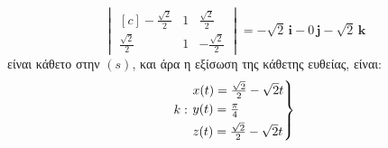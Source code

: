 \documentclass[a4paper,table]{report}
\begin{document}
\begin{solution}
\begin{enumerate}[i)]
\[\begin{vmatrix*}[c]
            - \frac{\sqrt{2}}{2} & 1 & \frac{\sqrt{2}}{2} \\[8pt]
            \frac{\sqrt{2}}{2} & 1 & - \frac{\sqrt{2}}{2} 
          \end{vmatrix*} = - \sqrt{2} \, \mathbf{i} - 0 \, \mathbf{j} - \sqrt{2} \,
          \mathbf{k}
         \] 
         είναι κάθετο στην $ (s) $, και άρα η εξίσωση της κάθετης ευθείας, είναι:
         \[
           k: \begin{rcases} 
             x(t) = \frac{\sqrt{2}}{2} - \sqrt{2} t \\
             y(t) = \frac{\pi}{4} \\
             z(t) = \frac{\sqrt{2}}{2} - \sqrt{2} t
           \end{rcases}
          \] 
    \end{enumerate} 
\end{solution}
\end{document}
